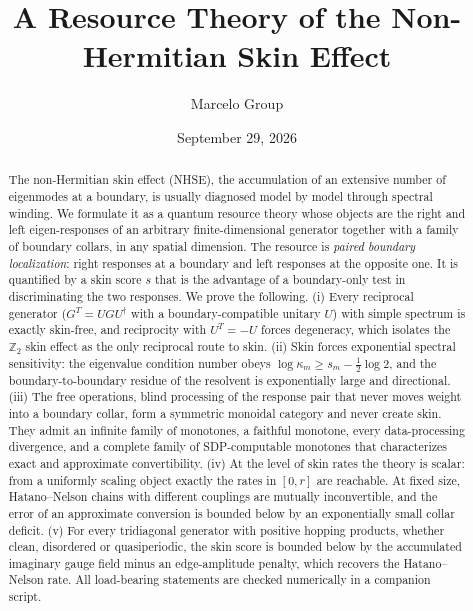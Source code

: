 \documentclass[11pt]{article}
\title{A Resource Theory of the Non-Hermitian Skin Effect}
\author{Marcelo Group}
\date{September 29, 2026}
\theoremstyle{definition}
\theoremstyle{remark}
\begin{document}
\maketitle

\begin{abstract}
The non-Hermitian skin effect (NHSE), the accumulation of an extensive number of eigenmodes at a boundary, is usually diagnosed model by model through spectral winding. We formulate it as a quantum resource theory whose objects are the right and left eigen-responses of an arbitrary finite-dimensional generator together with a family of boundary collars, in any spatial dimension. The resource is \emph{paired boundary localization}: right responses at a boundary and left responses at the opposite one. It is quantified by a skin score $s$ that is the advantage of a boundary-only test in discriminating the two responses. We prove the following.
(i) Every reciprocal generator ($G^{T}=UGU^\dagger$ with a boundary-compatible unitary $U$) with simple spectrum is exactly skin-free, and reciprocity with $U^{T}=-U$ forces degeneracy, which isolates the $\mathbb Z_2$ skin effect as the only reciprocal route to skin.
(ii) Skin forces exponential spectral sensitivity: the eigenvalue condition number obeys $\log\kappa_m\ge s_m-\tfrac12\log2$, and the boundary-to-boundary residue of the resolvent is exponentially large and directional.
(iii) The free operations, blind processing of the response pair that never moves weight into a boundary collar, form a symmetric monoidal category and never create skin. They admit an infinite family of monotones, a faithful monotone, every data-processing divergence, and a complete family of SDP-computable monotones that characterizes exact and approximate convertibility.
(iv) At the level of skin rates the theory is scalar: from a uniformly scaling object exactly the rates in $[0,r]$ are reachable. At fixed size, Hatano--Nelson chains with different couplings are mutually inconvertible, and the error of an approximate conversion is bounded below by an exponentially small collar deficit.
(v) For every tridiagonal generator with positive hopping products, whether clean, disordered or quasiperiodic, the skin score is bounded below by the accumulated imaginary gauge field minus an edge-amplitude penalty, which recovers the Hatano--Nelson rate.
All load-bearing statements are checked numerically in a companion script.
\end{abstract}

\end{document}
